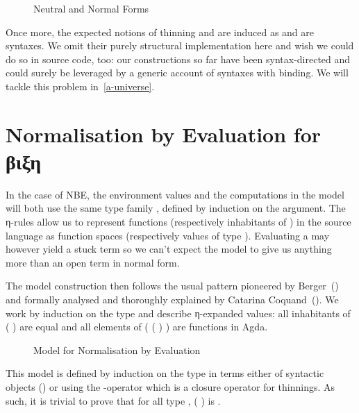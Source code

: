 \begin{figure}[h]
\caption{Neutral and Normal Forms}
\end{figure}

Once more, the expected notions of thinning  and
 are induced as  and  are syntaxes.
We omit their purely
structural implementation here and wish we could do so in source code,
too: our constructions so far have been syntax-directed and could
surely be leveraged by a generic account of syntaxes with binding.
We will tackle this problem in~\cref{a-universe}.

\section{Normalisation by Evaluation for βιξη}
\label{normbye}

In the case of NBE, the environment values and the computations in the model
will both use the same type family , defined by induction on the
 argument. The η-rules allow us to represent functions (respectively
inhabitants of ) in the source language as function spaces
(respectively values of type ). Evaluating a  may however
yield a stuck term so we can't expect the model to give us anything more than
an open term in normal form.

The model construction then follows the usual pattern pioneered by
Berger~(\citeyear{berger1993program}) and formally analysed and thoroughly
explained by Catarina Coquand~(\citeyear{coquand2002formalised}). We work
by induction on the type and describe η-expanded values: all inhabitants
of (  ) are equal and all elements
of ( (  ) ) are functions in Agda.

\begin{figure}[h]
\caption{Model for Normalisation by Evaluation\label{fig:nbemodel}}
\end{figure}

This model is defined by induction on the type in terms either of
syntactic objects () or using the -operator which is
a closure operator for thinnings. As such, it is trivial to prove
that for all type , ( ) is .

